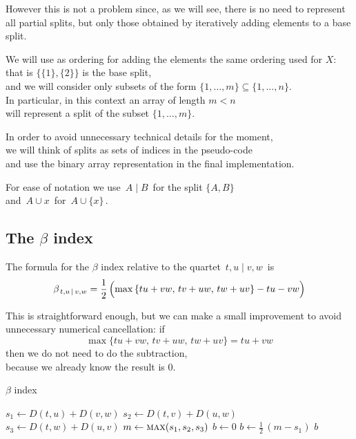 \documentclass[./main.tex]{subfiles}
\begin{document}
However this is not a problem since, as we will see, there is no need to represent all partial splits, but only those obtained by iteratively adding elements to a base split.\bigskip

We will use as ordering for adding the elements the same ordering used for $X$: \\[1pt]
that is  $\bigl\{ \{1\},\{2\} \bigr\}$ is the base split, \\
\bsp and we will consider only subsets of the form $\{ 1, \dots, m \} \subseteq \{ 1, \dots, n \}$. \\
In particular, in this context an array of length $m < n$ \\
\bsp will represent a split of the subset $\{ 1, \dots, m \}$.\bigskip\bigskip

In order to avoid unnecessary technical details for the moment, \\
we will think of splits as sets of indices in the pseudo-code \\
and use the binary array representation in the final implementation.

For ease of notation we use $\, A \mathbin{|} B \,$ for the split $\bigl\{ A, B \bigr\}$ \\[1pt]
\bsp and $\, A \cup x \,$ for $\, A \cup \{x\} \,$.\bigskip

\clearpage


\subsection*{The $\beta$ index}

The formula for the $\beta$ index relative to the quartet $\, t,u \mathbin{|} v,w \,$ is
\[ \beta_{\, t,u \,\mathbin{|}\, v,w} = \frac{1}{2}\, \Bigl( \max {\{ tu + vw,\, tv + uw,\, tw + uv \}} - tu - vw \Bigr) \]

This is straightforward enough, but we can make a small improvement to avoid unnecessary numerical cancellation: if
\[ \max {\{ tu + vw,\, tv + uw,\, tw + uv \}} = tu + vw \]
then we do not need to do the subtraction, \\
\bsp because we already know the result is $0$.\bigskip

\begin{algorithm}
\caption{$\beta$ index}
\begin{algorithmic}[1]
        \State $s_1 \gets D(t,u) + D(v,w)$
        \State $s_2 \gets D(t,v) + D(u,w)$
        \State $s_3 \gets D(t,w) + D(u,v)$
        \State $m \gets \Call{max}{s_1, s_2, s_3}$
            \State $b \gets 0$
        \Else
            \State $b \gets \frac{1}{2}\, (m - s_1)$
        \EndIf
        \State \Return $b$
    \EndFunction
\end{algorithmic}
\end{algorithm}
\end{document}
